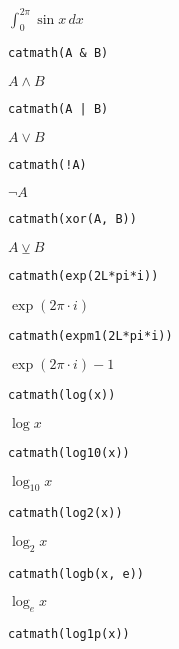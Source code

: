 \(\int_{{0}}^{{{2}{}\pi}}{{\sin{x}}}\,{d{x}}\)

\begin{verbatim}
catmath(A & B)
\end{verbatim}

\({{A}\land{B}}\)

\begin{verbatim}
catmath(A | B)
\end{verbatim}

\({{A}\lor{B}}\)

\begin{verbatim}
catmath(!A)
\end{verbatim}

\({\lnot{A}}\)

\begin{verbatim}
catmath(xor(A, B))
\end{verbatim}

\({{A}\veebar{B}}\)

\begin{verbatim}
catmath(exp(2L*pi*i))
\end{verbatim}

\({\exp\left({{{2}{}\pi}\cdot{i}}\right)}\)

\begin{verbatim}
catmath(expm1(2L*pi*i))
\end{verbatim}

\({{\exp\left({{{2}{}\pi}\cdot{i}}\right)}-{1}}\)

\begin{verbatim}
catmath(log(x))
\end{verbatim}

\({\log{x}}\)

\begin{verbatim}
catmath(log10(x))
\end{verbatim}

\({{\log_{10}}{x}}\)

\begin{verbatim}
catmath(log2(x))
\end{verbatim}

\({{\log_{2}}{x}}\)

\begin{verbatim}
catmath(logb(x, e))
\end{verbatim}

\({{\log_{e}}{x}}\)

\begin{verbatim}
catmath(log1p(x))
\end{verbatim}

